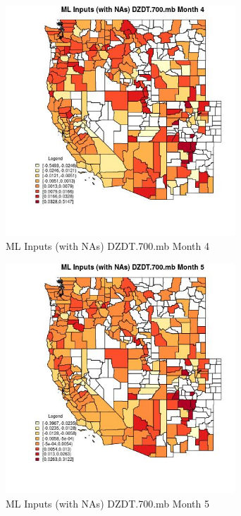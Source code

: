 \begin{figure} 
\centering  
\includegraphics[width=0.77\textwidth]{Code_Outputs/Report_ML_input_PM25_Step4_part_f_de_duplicated_aves_prioritize_24hr_obswNAs_CountyDZDT700mbmedianMonth4.jpg} 
\caption{\label{fig:Report_ML_input_PM25_Step4_part_f_de_duplicated_aves_prioritize_24hr_obswNAsCountyDZDT700mbmedianMonth4}ML Inputs (with NAs) DZDT.700.mb Month 4} 
\end{figure} 
 

\begin{figure} 
\centering  
\includegraphics[width=0.77\textwidth]{Code_Outputs/Report_ML_input_PM25_Step4_part_f_de_duplicated_aves_prioritize_24hr_obswNAs_CountyDZDT700mbmedianMonth5.jpg} 
\caption{\label{fig:Report_ML_input_PM25_Step4_part_f_de_duplicated_aves_prioritize_24hr_obswNAsCountyDZDT700mbmedianMonth5}ML Inputs (with NAs) DZDT.700.mb Month 5} 
\end{figure} 
 

